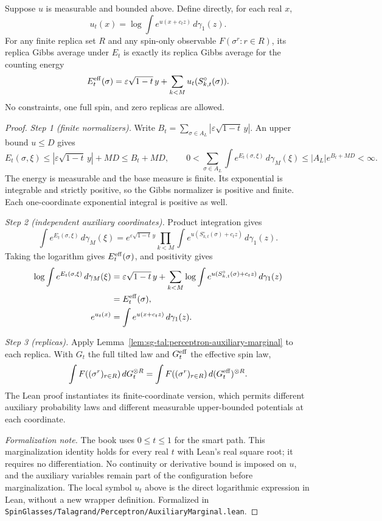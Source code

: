 \begin{theorem}\label{thm:sg-tal:perceptron-auxiliary-spins}
  \leanok
Suppose $u$ is measurable and bounded above. Define directly, for each real $x$,
\[
 u_t(x)=\log\int e^{u(x+c_tz)}\,d\gamma_1(z).
\]
For any finite replica set $R$ and any spin-only observable $F(\sigma^r:r\in R)$,
its replica Gibbs average under $E_t$ is exactly its replica Gibbs average for the counting energy
\[
 E_t^{\rm eff}(\sigma)=\varepsilon\sqrt{1-t}\,y+
       \sum_{k<M}u_t(S^\circ_{k,t}(\sigma)).
\]
No constraints, one full spin, and zero replicas are allowed.
\end{theorem}
\begin{proof}
  \leanok
\emph{Step 1 (finite normalizers).} Write
$B_t=\sum_{\sigma\in A_L}|\varepsilon\sqrt{1-t}\,y|$. An upper bound $u\le D$ gives
\[
 E_t(\sigma,\xi)\le|\varepsilon\sqrt{1-t}\,y|+MD\le B_t+MD,\qquad
 0<\sum_{\sigma\in A_L}\int e^{E_t(\sigma,\xi)}\,d\gamma_M(\xi)
 \le |A_L|e^{B_t+MD}<\infty.
\]
The energy is measurable and the base measure is finite. Its exponential is integrable and
strictly positive, so the Gibbs normalizer is positive and finite. Each one-coordinate
exponential integral is positive as well.

\emph{Step 2 (independent auxiliary coordinates).} Product integration gives
\[
 \int e^{E_t(\sigma,\xi)}\,d\gamma_M(\xi)
 = e^{\varepsilon\sqrt{1-t}\,y}
   \prod_{k<M}\int e^{u(S^\circ_{k,t}(\sigma)+c_tz)}\,d\gamma_1(z).
\]
Taking the logarithm gives $E_t^{\rm eff}(\sigma)$, and
positivity gives
\begin{align*}
 \log\int e^{E_t(\sigma,\xi)}\,d\gamma_M(\xi)
 &=\varepsilon\sqrt{1-t}\,y+
   \sum_{k<M}\log\int e^{u(S^\circ_{k,t}(\sigma)+c_tz)}\,d\gamma_1(z)\\
 &=E_t^{\rm eff}(\sigma),\\
 e^{u_t(x)}&=\int e^{u(x+c_tz)}\,d\gamma_1(z).
\end{align*}

\emph{Step 3 (replicas).} Apply Lemma~\ref{lem:sg-tal:perceptron-auxiliary-marginal} to each replica.
With $G_t$ the full tilted law and $G_t^{\rm eff}$ the effective spin law,
\[
 \int F((\sigma^r)_{r\in R})\,dG_t^{\otimes R}
 =\int F((\sigma^r)_{r\in R})\,d(G_t^{\rm eff})^{\otimes R}.
\]
The Lean proof instantiates its finite-coordinate version, which permits different auxiliary
probability laws and different measurable upper-bounded potentials at each coordinate.

\emph{Formalization note.} The book uses $0\le t\le1$ for the smart path. This marginalization
identity holds for every real $t$ with Lean's real square root; it requires no differentiation.
No continuity or derivative bound is imposed on $u$, and the auxiliary variables remain
part of the configuration before marginalization. The local symbol $u_t$ above is the direct
logarithmic expression in Lean, without a new wrapper definition.
Formalized in \texttt{SpinGlasses/Talagrand/Perceptron/AuxiliaryMarginal.lean}.
\end{proof}

